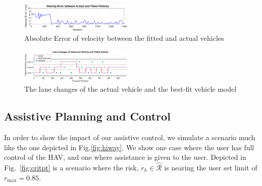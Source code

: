 \documentclass[letterpaper, 10 pt, conference]{ieeeconf}  %
\begin{document}
\begin{figure}[ht]
    \includegraphics[width=0.48\textwidth]{fig/fiterroravg.png}
    \caption{Absolute Error of velocity between the fitted and actual vehicles} \label{fig:fwd}
\end{figure}

\begin{figure}[htpb!]
    \includegraphics[width=0.48\textwidth]{fig/lanefit.png}
    \caption{The lane changes of the actual vehicle and the best-fit vehicle model} \label{fig:lanchan}
\end{figure}
\subsection{Assistive Planning and Control}
In order to show the impact of our assistive control, we simulate a scenario much like the one depicted in Fig.\ref{fig:hiway}. We show one case where the user has full control of the HAV, and one where assistance is given to the user. Depicted in Fig.~\ref{fig:critpt} is a scenario where the risk, $r_h\in\hat{\mathcal{R}}$ is nearing the user set limit of $r_{\max} = 0.85$.
\end{document}
